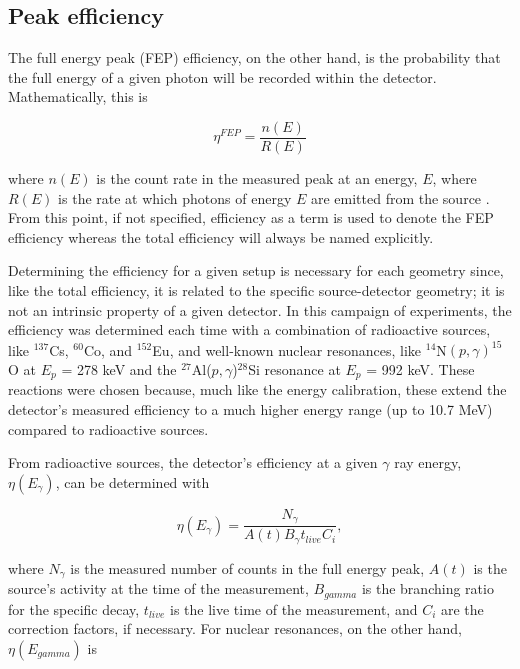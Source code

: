 \subsection{Peak efficiency}

The full energy peak (FEP) efficiency, on the other hand, is the probability that the full energy of a given photon will be recorded within the detector. Mathematically, this is

\begin{equation}
\eta^{FEP} = \dfrac{n(E)}{R(E)}
\end{equation}

\noindent where $n(E)$ is the count rate in the measured peak at an energy, $E$, where $R(E)$ is the rate at which photons of energy $E$ are emitted from the source \cite{DebertinHelmerBook}. From this point, if not specified, efficiency as a term is used to denote the FEP efficiency whereas the total efficiency will always be named explicitly. 

Determining the efficiency for a given setup is necessary for each geometry since, like the total efficiency, it is related to the specific source-detector geometry; it is not an intrinsic property of a given detector. In this campaign of experiments, the efficiency was determined each time with a combination of radioactive sources, like $^{137}$Cs, $^{60}$Co, and $^{152}$Eu, and well-known nuclear resonances, like $^{14}$N$\left( p,\gamma \right) ^{15}$O at $E_{p}$ = 278 keV and the $^{27}$Al($p, \gamma$)$^{28}$Si resonance at $E_{p}$ = 992 keV. These reactions were chosen because, much like the energy calibration, these extend the detector's measured efficiency to a much higher energy range (up to 10.7 MeV) compared to radioactive sources. 

From radioactive sources, the detector's efficiency at a given $\gamma$ ray energy, $\eta(E_{\gamma})$, can be determined with

\begin{equation}
\eta (E_{\gamma}) = \dfrac{N_{\gamma}}{A(t) B_{\gamma} t_{live} C_{i}},
\end{equation}

\noindent where $N_{\gamma}$ is the measured number of counts in the full energy peak, $A(t)$ is the source's activity at the time of the measurement, $B_{gamma}$ is the branching ratio for the specific decay, $t_{live}$ is the live time of the measurement, and $C_{i}$ are the correction factors, if necessary. For nuclear resonances, on the other hand, $\eta (E_{gamma})$ is 

